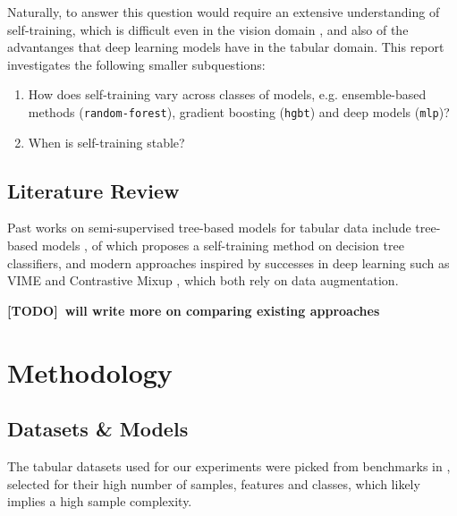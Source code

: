 \documentclass{article}
\newcommand{\todo}{\bf \color{blue} [TODO]~}
\begin{document}
Naturally, to answer this question would require an extensive understanding of
self-training, which is difficult even in the vision domain \cite{wei2022theoretical},
and also of the advantanges that deep learning models have in the tabular domain.
This report investigates the following smaller subquestions: \begin{enumerate}
  \item How does self-training vary across classes of models, e.g. ensemble-based
  methods (\texttt{random-forest}), gradient boosting (\texttt{hgbt}) and deep models
  (\texttt{mlp})?
  \item When is self-training stable?
\end{enumerate}

\subsection{Literature Review}

Past works on semi-supervised tree-based models for tabular data include
tree-based models \cite{kemp2003semisupervised,levatic2017semisupervised,
tanha2017semisupervised}, of which \cite{tanha2017semisupervised} proposes a
self-training method on decision tree classifiers, and modern approaches inspired by
successes in deep learning such as VIME \cite{yoon2020vime} and Contrastive Mixup
\cite{darabi2021contrastive}, which both rely on data augmentation.

{\todo will write more on comparing existing approaches}

\section{Methodology}\label{sec:met}

\subsection{Datasets \& Models}

The tabular datasets used for our experiments were picked from benchmarks in
\cite{grinsztajn2022why,shwartz-ziv2021tabular}, selected for their high number of
samples, features and classes, which likely implies a high sample complexity.
\end{document}
